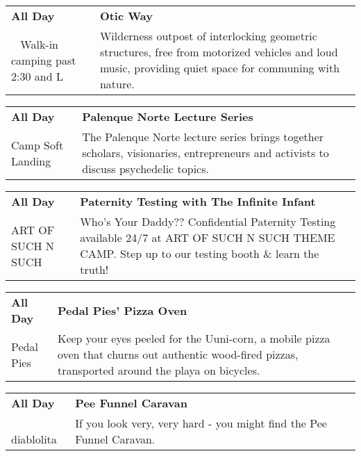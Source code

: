 \begin{tabular}{ p{1in} p{2.2in} }
    \textbf{All Day} & \textbf{Otic Way} \\
    ~ \newline Walk-in camping past 2:30 and L & Wilderness outpost of interlocking geometric structures, free from motorized vehicles and loud music, providing quiet space for communing with nature. \\
    \hline 
\end{tabular}
    
\begin{tabular}{ p{1in} p{2.2in} }
    \textbf{All Day} & \textbf{Palenque Norte Lecture Series} \\
    Camp Soft Landing \newline  & The Palenque Norte lecture series brings together scholars, visionaries, entrepreneurs and activists to discuss psychedelic topics. \\
    \hline 
\end{tabular}
    
\begin{tabular}{ p{1in} p{2.2in} }
    \textbf{All Day} & \textbf{Paternity Testing with The Infinite Infant} \\
    ART OF SUCH N SUCH \newline  & Who's Your Daddy?? Confidential Paternity Testing available 24/7 at ART OF SUCH N SUCH THEME CAMP. Step up to our testing booth \& learn the truth! \\
    \hline 
\end{tabular}
    
\begin{tabular}{ p{1in} p{2.2in} }
    \textbf{All Day} & \textbf{Pedal Pies' Pizza Oven} \\
    Pedal Pies \newline  & Keep your eyes peeled for the Uuni-corn, a mobile pizza oven that churns out authentic wood-fired pizzas, transported around the playa on bicycles. \\
    \hline 
\end{tabular}
    
\begin{tabular}{ p{1in} p{2.2in} }
    \textbf{All Day} & \textbf{Pee Funnel Caravan} \\
    ~ \newline diablolita & If you look very, very hard - you might find the Pee Funnel Caravan. \\
    \hline 
\end{tabular}
    
